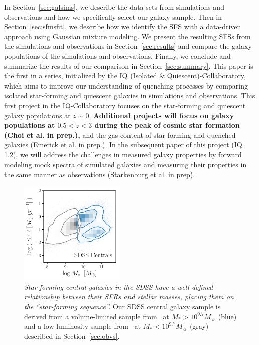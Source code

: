 \documentclass[tighten, preprint]{aastex62}
\newcommand{\todo}[1]{{\bf \textcolor{red}{ #1}}}
\begin{document}
In Section~\ref{sec:galsims}, we describe the data-sets from simulations
and observations and how we specifically select our galaxy sample. 
Then in Section~\ref{sec:sfmsfit}, we describe how we identify the SFS 
with a data-driven approach using Gaussian mixture modeling. We present 
the resulting SFSs from the simulations and observations in 
Section~\ref{sec:results} and compare the galaxy populations
of the simulations and observations. Finally, we conclude and summarize
the results of our comparison in Section~\ref{sec:summary}.
This paper is the first in a series, initialized by the IQ (Isolated 
\& Quiescent)-Collaboratory, which aims to improve our understanding 
of quenching processes by comparing isolated star-forming 
and quiescent galaxies in simulations and observations. This first 
project in the IQ-Collaboratory focuses on the star-forming and quiescent 
galaxy populations at $z\sim 0$. 
{\bf \color{red} 
Additional projects will focus on galaxy 
populations at $0.5 < z < 3$ during the peak of cosmic star formation 
(Choi et al. in prep.),
}
and the gas content of star-forming and quenched galaxies (Emerick et al. 
in prep.).  %
In the subsequent paper of this project (IQ 1.2), we will address the challenges 
in measured galaxy properties by forward modeling mock spectra of simulated 
galaxies and measuring their properties in the same manner as observations 
(Starkenburg et al. in prep).


\begin{figure}
\begin{center}
\includegraphics[width=0.45\textwidth]{Obvs_SFR_Mstar.pdf} 
\caption{\emph{Star-forming central galaxies in the SDSS 
have a well-defined relationship between their SFRs and stellar masses, 
placing them on the ``star-forming sequence''.} Our SDSS central galaxy 
sample is derived from a volume-limited sample from~\cite{tinker2011} 
at $M_* > 10^{9.7} M_\sun$ (blue) and a low luminosity sample 
from~\cite{geha2012} at $M_* < 10^{9.7} M_\sun$ (gray) described in 
Section~\ref{sec:obvs}.
}
\label{fig:sfrmstar_sdss}
\end{center}
\end{figure}
\end{document}
